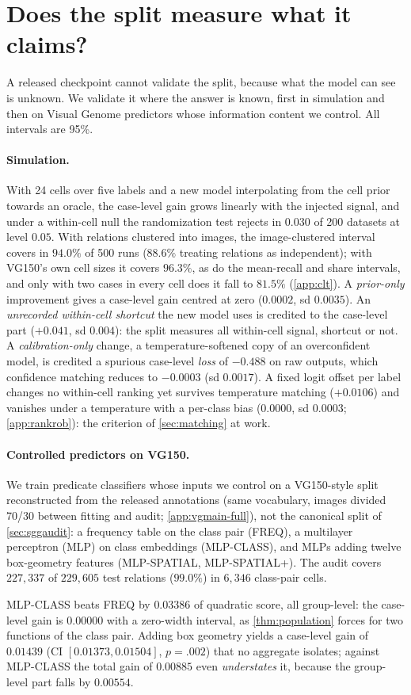 \section{Does the split measure what it claims?}\label{sec:exp}

A released checkpoint cannot validate the split, because what the model can see is unknown.
We validate it where the answer is known, first in simulation and then on Visual Genome
predictors whose information content we control. All intervals are 95\%.

\paragraph{Simulation.}\label{sec:simulation} With 24 cells over five labels and a new model
interpolating from the cell prior towards an oracle, the case-level gain grows linearly with
the injected signal, and under a within-cell null the randomization test rejects in $0.030$
of 200 datasets at level $0.05$. With relations clustered into images, the image-clustered
interval covers in $94.0\%$ of 500 runs ($88.6\%$ treating relations as independent); with
VG150's own cell sizes it covers $96.3\%$, as do the mean-recall and share intervals, and only
with two cases in every cell does it fall to $81.5\%$ (\cref{app:clt}).
A \emph{prior-only} improvement gives a case-level gain centred at zero ($0.0002$, sd
$0.0035$). An \emph{unrecorded within-cell shortcut} the new model uses is credited to the
case-level part ($+0.041$, sd $0.004$): the split measures all within-cell signal, shortcut
or not. A \emph{calibration-only} change, a temperature-softened copy of an overconfident
model, is credited a spurious case-level \emph{loss} of $-0.488$ on raw outputs, which
confidence matching reduces to $-0.0003$ (sd $0.0017$). A fixed logit offset per label
changes no within-cell ranking yet survives temperature matching ($+0.0106$) and vanishes
under a temperature with a per-class bias ($0.0000$, sd $0.0003$; \cref{app:rankrob}): the
criterion of \cref{sec:matching} at work.

\paragraph{Controlled predictors on VG150.}\label{sec:data} We train predicate classifiers
whose inputs we control on a VG150-style split reconstructed from the released annotations
(same vocabulary, images divided 70/30 between fitting and audit; \cref{app:vgmain-full}),
not the canonical split of \cref{sec:sggaudit}: a frequency table on the class pair (FREQ),
a multilayer perceptron (MLP) on class embeddings (MLP-CLASS), and MLPs adding twelve box-geometry features
(MLP-SPATIAL, MLP-SPATIAL+). The audit covers $227{,}337$ of $229{,}605$ test relations
($99.0\%$) in $6{,}346$ class-pair cells.

MLP-CLASS beats FREQ by $0.03386$ of quadratic score, all group-level: the case-level gain is
$0.00000$ with a zero-width interval, as \cref{thm:population} forces for two functions of the
class pair.
Adding box geometry yields a case-level gain of $0.01439$ (CI $[0.01373,0.01504]$, $p=.002$)
that no aggregate isolates; against MLP-CLASS the total gain of $0.00885$ even
\emph{understates} it, because the group-level part falls by $0.00554$.
